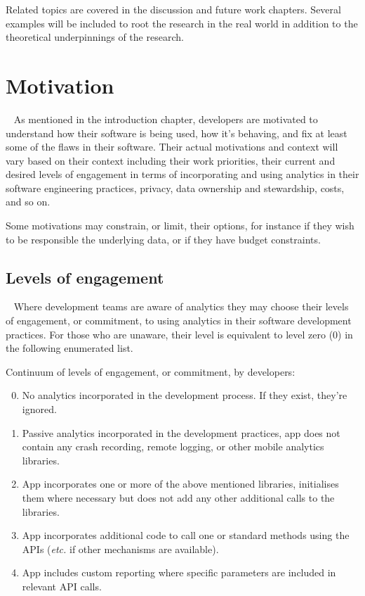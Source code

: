 Related topics are covered in the discussion and future work chapters. Several examples will be included to root the research in the real world in addition to the theoretical underpinnings of the research.


\section{Motivation}~\label{motivation-section}
As mentioned in the introduction chapter, developers are motivated to understand how their software is being used, how it's behaving, and fix at least some of the flaws in their software. Their actual motivations and context will vary based on their context including their work priorities, their current and desired levels of engagement in terms of incorporating and using analytics in their software engineering practices, privacy, data ownership and stewardship, costs, and so on.

Some motivations may constrain, or limit, their options, for instance if they wish to be responsible the underlying data, or if they have budget constraints.

\subsection{Levels of engagement}~\label{subsection-levels-of-engagement}
Where development teams are aware of analytics they may choose their levels of engagement, or commitment, to using analytics in their software development practices. For those who are unaware, their level is equivalent to level zero (0) in the following enumerated list. 

Continuum of levels of engagement, or commitment, by developers:
\begin{enumerate}
    \setcounter{enumi}{-1} %
    \item No analytics incorporated in the development process. If they exist, they're ignored.
    \item Passive analytics incorporated in the development practices, app does not contain any crash recording, remote logging, or other mobile analytics libraries.
    \item App incorporates one or more of the above mentioned libraries, initialises them where necessary but does not add any other additional calls to the libraries.
    \item App incorporates additional code to call one or standard methods using the APIs (\emph{etc.} if other mechanisms are available).
    \item App includes custom reporting where specific parameters are included in relevant API calls.
\end{enumerate}

